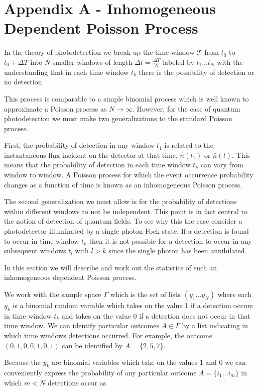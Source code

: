 \documentclass[12pt]{article}
\begin{document}
\section{Appendix A - Inhomogeneous Dependent Poisson Process}

In the theory of photodetection we break up the time window $\mathcal{T}$ from $t_0$ to $t_0+\Delta T$ into $N$ smaller windows of length $\Delta t = \frac{\Delta T}{N}$ labeled by $t_1 \ldots t_N$ with the understanding that in each time window $t_k$ there is the possibility of detection or no detection.

This process is comparable to a simple binomial process which is well known to approximate a Poisson process as $N \rightarrow \infty$. However, for the case of quantum photodetection we must make two generalizations to the standard Poisson process. 

First, the probability of detection in any window $t_1$ is related to the instantaneous flux incident on the detector at that time, $\hat{n}(t_1)$ or $\bar{n}(t)$. This means that the probability of detection in each time window $t_k$ can vary from window to window. A Poisson process for which the event occurrence probability changes as a function of time is known as an inhomogeneous Poisson process.

The second generalization we must allow is for the probability of detections within different windows to not be independent. This point is in fact central to the notion of detection of quantum fields. To see why this the case consider a photodetector illuminated by a single photon Fock state. If a detection is found to occur in time window $t_k$ then it is not possible for a detection to occur in any subsequent windows $t_l$ with $l>k$ since the single photon has been annihilated.

In this section we will describe and work out the statistics of such an inhomogeneous dependent Poisson process.

We work with the sample space $\Gamma$ which is the set of lists $(y_1 \ldots y_N)$ where each $y_k$ is a binomial random variable which takes on the value 1 if a detection occurs in time window $t_k$ and takes on the value 0 if a detection does not occur in that time window. We can identify particular outcomes $A \in \Gamma$ by a list indicating in which time windows detections occurred. For example, the outcome $(0,1,0,0,1,0,1)$ can be identified by $A = \{2, 5, 7\}$.

Because the $y_k$ are binomial variables which take on the values 1 and 0 we can conveniently express the probability of any particular outcome $A = \{i_1 \ldots i_m \}$ in which $m<N$ detections occur as
\end{document}
